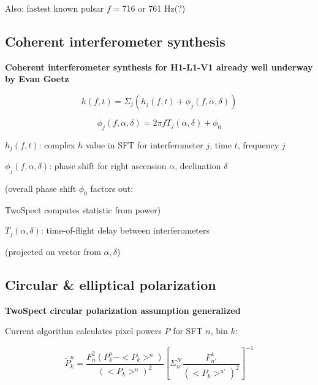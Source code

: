Also: fastest known pulsar $f=$716 or 761 Hz(?)



\subsection{Coherent interferometer synthesis}


\textbf{Coherent interferometer synthesis for H1-L1-V1 already well underway by Evan Goetz}


\begin{equation}
h(f,t)=\Sigma_{j}\left(h_{j}(f,t)+\phi_{j}(f,\alpha,\delta)\right)
\label{TwoSpect_h_synth}
\end{equation}



\begin{equation}
\phi_{j}(f,\alpha,\delta)=2\pi fT_{j}(\alpha,\delta)+\phi_{0}
\label{TwoSpect_phase_synth}
\end{equation}



\emph{$h_{j}(f,t)$}: complex $h$ value in SFT for interferometer
$j$, time $t$, frequency $j$


$\phi_{j}(f,\alpha,\delta)$: phase shift for right ascension $\alpha$,
declination $\delta$


(overall phase shift $\phi_{0}$ factors out: 


TwoSpect computes statistic from power)


$T_{j}(\alpha,\delta)$: time-of-flight delay between interferometers 


(projected on vector from $\alpha,\delta$)


\subsection{Circular \& elliptical polarization}


\textbf{TwoSpect circular polarization assumption generalized}


Current algorithm calculates pixel powers $P$ for SFT $n$, bin $k$:


\begin{equation}
\tilde{P}_{k}^{n}=\frac{F_{n}^{2}(P_{k}^{n}-<P_{k}>^{n})}{(<P_{k}>^{n})^{2}}\left[\Sigma_{n'}^{N}\frac{F_{n'}^{4}}{(<P_{k}>^{n'})^{2}}\right]^{-1}
\label{TwoSpect_pixel_powers}
\end{equation}

